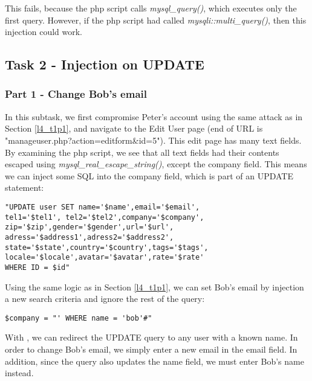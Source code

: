 This fails, because the php script calls \emph{mysql\_query()}, which executes only the first query. However, if the php script had called \emph{mysqli::multi\_query()}, then this injection could work.

\subsection{Task 2 - Injection on UPDATE}
\subsubsection{Part 1 - Change Bob's email} \label{l4_t2p1}
In this subtask, we first compromise Peter's account using the same attack as in Section \ref{l4_t1p1}, and navigate to the Edit User page (end of URL is "manageuser.php?action=editform\&id=5"). This edit page has many text fields. By examining the php script, we see that all text fields had their contents escaped using \emph{mysql\_real\_escape\_string()}, except the company field. This means we can inject some SQL into the company field, which is part of an UPDATE statement:

\begin{minipage}{\linewidth}
\begin{lstlisting}[caption={UPDATE statement from the edit form},
label={lst:l4_t1p2_updq},
frame=single]
"UPDATE user SET name='$name',email='$email',
tel1='$tel1', tel2='$tel2',company='$company',
zip='$zip',gender='$gender',url='$url',
adress='$address1',adress2='$address2',
state='$state',country='$country',tags='$tags',
locale='$locale',avatar='$avatar',rate='$rate'
WHERE ID = $id"
\end{lstlisting}
\end{minipage}

Using the same logic as in Section \ref{l4_t1p1}, we can set Bob's email by injection a new search criteria and ignore the rest of the query:

\begin{minipage}{\linewidth}
\begin{lstlisting}[caption={UPDATE statement redirection},
label={lst:l4_t1p2_compatk},
frame=single]
$company = "' WHERE name = 'bob'#"
\end{lstlisting}
\end{minipage}

With , we can redirect the UPDATE query to any user with a known name. In order to change Bob's email, we simply enter a new email in the email field. In addition, since the query also updates the name field, we must enter Bob's name instead.

